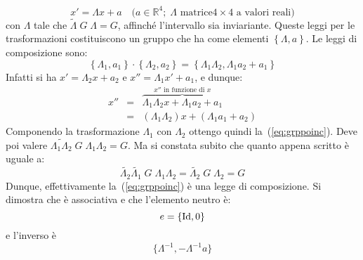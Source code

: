 \begin{equation}
x'=\Lambda x+a\quad\mbox{($a\in\mathbb{R}^4;\;\Lambda$ matrice
$4\times4$ a valori reali)}
\end{equation}
con $\Lambda$ tale che 
$\widetilde{\Lambda}\;G\;\Lambda=G$, affinch\'e l'intervallo sia
inviariante. 
Queste leggi per le trasformazioni costituiscono un gruppo che ha come elementi
$\left\{\Lambda,a\right\}$. Le leggi di composizione sono:
\begin{equation}
\left\{\Lambda_{1},a_{1}\right\}\cdot\left\{\Lambda_{2},a_{2}\right\}=
\left\{\Lambda_{1}\Lambda_{2},\Lambda_{1}a_{2}+a_{1}\right\}
\label{eq:grppoinc}
\end{equation}
Infatti si ha $x'=\Lambda_{2}x+a_{2}$ e $x''=\Lambda_{1}x'+a_{1}$,
e dunque:
\begin{eqnarray*}
x''&=&\stackrel{x''\mbox{ in funzione di }
x}{\overbrace{\Lambda_{1}\Lambda_{2}x+\Lambda_{1}a_{2}+a_{1}}}\\
&=&(\Lambda_{1}\Lambda_{2})x+(\Lambda_{1}a_{1} + a_{2})
\end{eqnarray*}
Componendo la trasformazione $\Lambda_{1}$ con $\Lambda_{2}$
ottengo quindi la~(\ref{eq:grppoinc}).
Deve poi valere
$\widetilde{\Lambda_{1}\Lambda_{2}}\;G\;\Lambda_{1}\Lambda_{2}=G$.
Ma si constata subito che quanto appena scritto \`e uguale a:
\begin{equation}
 \widetilde{\Lambda_{2}} \widetilde{\Lambda_{1}} \; G \; 
 \Lambda_{1}\Lambda_{2}=\widetilde{\Lambda_{2}}\;G\;\Lambda_{2}=G
\end{equation}
Dunque, effettivamente la~(\ref{eq:grppoinc}) \`e una legge di
composizione. Si dimostra che \`e associativa e che l'elemento
neutro \`e:
\begin{equation}
 e=\{\mathrm{Id},0\}
\end{equation}
 e l'inverso \`e
\begin{equation}
\{\Lambda^{-1},-\Lambda^{-1}a\}
\end{equation}
